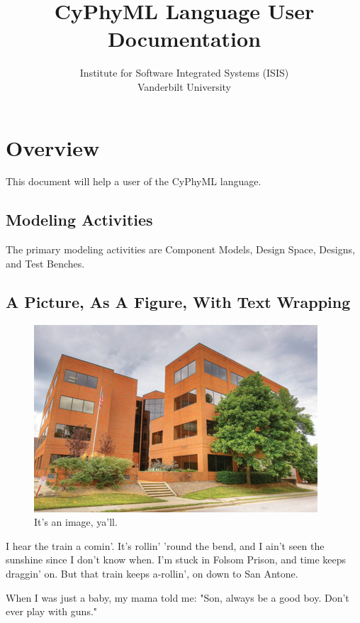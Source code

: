 \documentclass{article}
\begin{document}
\title{CyPhyML Language User Documentation}
\author{Institute for Software Integrated Systems (ISIS)\\Vanderbilt University}

\maketitle

\tableofcontents
\newpage

\section{Overview}
This document will help a user of the CyPhyML language.
\subsection{Modeling Activities}
The primary modeling activities are Component Models, Design Space, Designs, and Test Benches.

\subsection{A Picture, As A Figure, With Text Wrapping}
\begin{figure} %
\centering
\includegraphics[scale=0.40]{eng-musicrow.jpg}
\caption{It's an image, ya'll.}
\label{imageyall}
\end{figure}
I hear the train a comin'. It's rollin' 'round the bend, and I ain't seen the sunshine since I don't know when. I'm stuck in Folsom Prison, and time keeps draggin' on. But that train keeps a-rollin', on down to San Antone.

When I was just a baby, my mama told me: "Son, always be a good boy. Don't ever play with guns."
\end{document}
